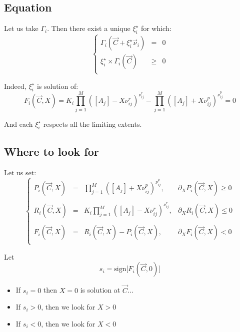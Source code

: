 \documentclass[aps,12pt]{revtex4}
\begin{document}
\subsection{Equation}
Let us take $\Gamma_i$.
Then there exist a unique $\xi_i^\star$ for which:
\begin{equation}
\left\lbrace
\begin{array}{rcl}
	\Gamma_i(\vec{C} + \xi_i^\star \vec{\nu}_i ) & = & 0\\
	 \xi_i^\star \times \Gamma_i(\vec{C}) &\geq  &0\\
\end{array}
\right.
\end{equation}
 
Indeed, $\xi_i^\star$ is solution of:
\begin{equation}
	 F_i(\vec{C},X) =  K_i \prod_{j=1}^{M} \left([A_j] - X \nu^r_{ij}\right)^{\nu^r_{ij}} 
	- \prod_{j=1}^{M} \left([A_j] + X \nu^p_{ij} \right)^{\nu^p_{ij}} = 0
\end{equation} 

And each $\xi_i^\star$ respects all the limiting extents.

\subsection{Where to look for}
Let us set:
\begin{equation}
\left\lbrace
\begin{array}{rcll}
	P_i(\vec{C},X) & = & \displaystyle \prod_{j=1}^{M} \left([A_j] + X \nu^p_{ij} \right)^{\nu^p_{ij}}, & \partial_X P_i(\vec{C},X) \geq 0 \\
	\\
	R_i(\vec{C},X) & = & \displaystyle K_i \prod_{j=1}^{M} \left([A_j] - X \nu^r_{ij}\right)^{\nu^r_{ij}}, & \partial_X R_i(\vec{C},X) \leq 0 \\
	\\
	 F_i(\vec{C},X) & = & R_i(\vec{C},X)  - P_i(\vec{C},X), & \partial_X F_i(\vec{C},X) < 0\\
\end{array}
\right.
\end{equation}

Let
\begin{equation}
	s_i = \mathrm{sign}\lbrack F_i(\vec{C},0) \rbrack
\end{equation}

\begin{itemize}
\item If $s_i=0$ then $X=0$ is solution at $\vec{C}$...

\item If $s_i>0$, then we look for $X>0$

\item If $s_i<0$, then we look for $X<0$

\end{itemize}
\end{document}
